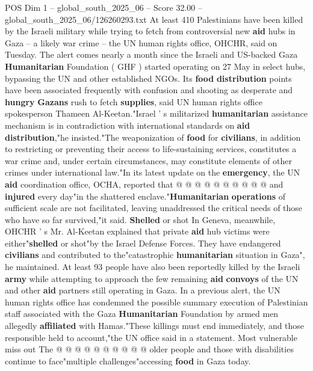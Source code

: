 \begin{textsample}{POS Dim 1 – global\_south\_2025\_06 – Score 32.00 – global\_south\_2025\_06/126260293.txt}  \label{ex:f1_pos_137}
At least 410 Palestinians have been killed by the Israeli military while trying to fetch from controversial new \textbf{aid} hubs in Gaza -- a likely war crime -- the UN human rights office, OHCHR, said on Tuesday.
The alert comes nearly a month since the Israeli and US-backed Gaza \textbf{Humanitarian} Foundation ( GHF ) started operating on 27 May in select hubs, bypassing the UN and other established NGOs.
Its \textbf{food} \textbf{distribution} points have been associated frequently with confusion and shooting as desperate and \textbf{hungry} \textbf{Gazans} rush to fetch \textbf{supplies}, said UN human rights office spokesperson Thameen Al-Keetan."Israel ' s militarized \textbf{humanitarian} assistance mechanism is in contradiction with international standards on \textbf{aid} \textbf{distribution},"he insisted."The weaponization of \textbf{food} for \textbf{civilians}, in addition to restricting or preventing their access to life-sustaining services, constitutes a war crime and, under certain circumstances, may constitute elements of other crimes under international law."In its latest update on the \textbf{emergency}, the UN \textbf{aid} coordination office, OCHA, reported that @ @ @ @ @ @ @ @ @ @ and \textbf{injured} every day"in the shattered enclave."\textbf{Humanitarian} \textbf{operations} of sufficient scale are not facilitated, leaving unaddressed the critical needs of those who have so far survived,"it said. \textbf{Shelled} or shot In Geneva, meanwhile, OHCHR ' s Mr.
Al-Keetan explained that private \textbf{aid} hub victims were either"\textbf{shelled} or shot"by the Israel Defense Forces.
They have endangered \textbf{civilians} and contributed to the"catastrophic \textbf{humanitarian} situation in Gaza", he maintained.
At least 93 people have also been reportedly killed by the Israeli \textbf{army} while attempting to approach the few remaining \textbf{aid} \textbf{convoys} of the UN and other \textbf{aid} partners still operating in Gaza.
In a previous alert, the UN human rights office has condemned the possible summary execution of Palestinian staff associated with the Gaza \textbf{Humanitarian} Foundation by armed men allegedly \textbf{affiliated} with Hamas."These killings must end immediately, and those responsible held to account,"the UN office said in a statement.
Most vulnerable miss out The @ @ @ @ @ @ @ @ @ @ older people and those with disabilities continue to face"multiple challenges"accessing \textbf{food} in Gaza today.

\end{textsample}
